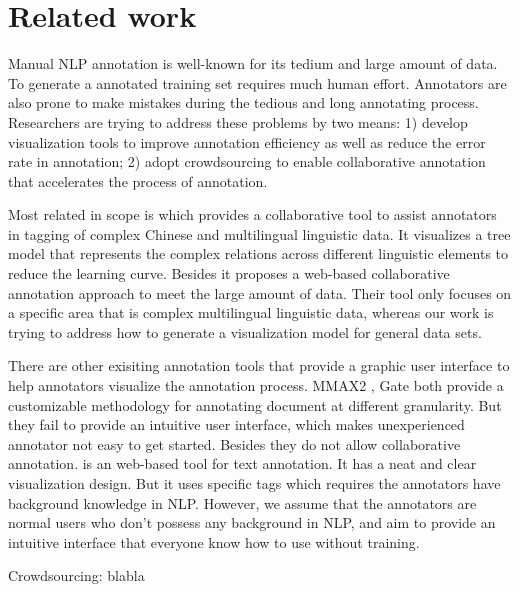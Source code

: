 \section{Related work}
Manual NLP annotation is well-known for its tedium and large amount of data. To generate a annotated training set requires much human effort. Annotators are also prone to make mistakes during the tedious and long annotating process. Researchers are trying to address these problems by two means: 1) develop visualization tools to improve annotation efficiency as well as reduce the error rate in annotation; 2) adopt crowdsourcing to enable collaborative annotation that accelerates the process of annotation.

Most related in scope is \cite{yan2012collaborative} which provides a collaborative tool to assist annotators in tagging of complex Chinese and multilingual linguistic data. It visualizes a tree model that represents the complex relations across different linguistic elements to reduce the learning curve. Besides it proposes a web-based collaborative annotation approach to meet the large amount of data. Their tool only focuses on a specific area that is complex multilingual linguistic data, whereas our work is trying to address how to generate a visualization model for general data sets.

There are other exisiting annotation tools that provide a graphic user interface to help annotators visualize the annotation process. MMAX2 \cite{mueller06b}, Gate \cite{gate} both provide a customizable methodology for annotating document at different granularity. But they fail to provide an intuitive user interface, which makes unexperienced annotator not easy to get started. Besides they do not allow collaborative annotation. \cite{brat} is an web-based tool for text annotation. It has a neat and clear visualization design. But it uses specific tags which requires the annotators have background knowledge in NLP. However, we assume that the annotators are normal users who don't possess any background in NLP, and aim to provide an intuitive interface that everyone know how to use without training.

Crowdsourcing: blabla